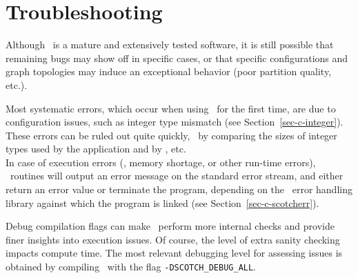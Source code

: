 
\section{Troubleshooting}

Although \scotch\ is a mature and extensively tested software, it is
still possible that remaining bugs may show off in specific cases, or
that specific configurations and graph topologies may induce an
exceptional behavior (poor partition quality, etc.).

Most systematic errors, which occur when using \scotch\ for the first
time, are due to configuration issues, such as integer type mismatch
(see Section~\ref{sec-c-integer}). These errors can be ruled out quite
quickly, \eg\ by comparing the sizes of integer types used by the
application and by \scotch, etc.
\\

In case of execution errors (\eg, memory shortage, or other run-time
errors), \scotch\ routines will output an error message on the
standard error stream, and either return an error value or terminate
the program, depending on the \scotch\ error handling library against
which the program is linked (see Section~\ref{sec-c-scotcherr}).

Debug compilation flags can make \scotch\ perform more internal checks
and provide finer insights into execution issues. Of course, the level
of extra sanity checking impacts compute time. The most relevant
debugging level for assessing issues is obtained by compiling
\scotch\ with the flag \texttt{-DSCOTCH\_\lbt DEBUG\_\lbt ALL}.
\\

